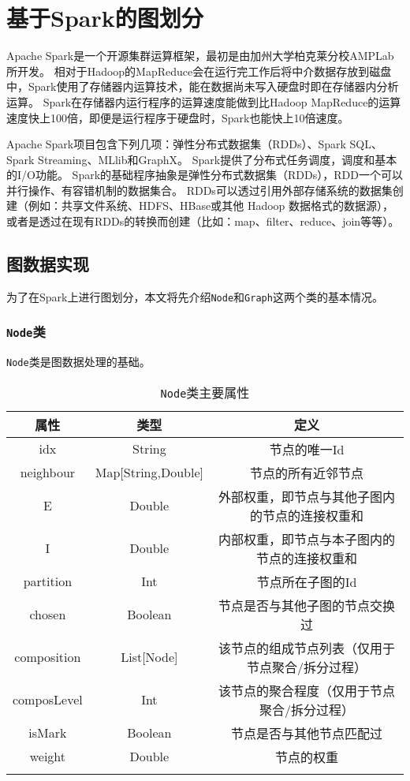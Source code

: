 \section{基于Spark的图划分}

Apache Spark是一个开源集群运算框架，最初是由加州大学柏克莱分校AMPLab所开发。
相对于Hadoop的MapReduce会在运行完工作后将中介数据存放到磁盘中，Spark使用了存储器内运算技术，能在数据尚未写入硬盘时即在存储器内分析运算。
Spark在存储器内运行程序的运算速度能做到比Hadoop MapReduce的运算速度快上100倍，即便是运行程序于硬盘时，Spark也能快上10倍速度。

Apache Spark项目包含下列几项：弹性分布式数据集（RDDs）、Spark SQL、Spark Streaming、MLlib和GraphX。
Spark提供了分布式任务调度，调度和基本的I/O功能。
Spark的基础程序抽象是弹性分布式数据集（RDDs），RDD一个可以并行操作、有容错机制的数据集合。
RDDs可以透过引用外部存储系统的数据集创建（例如：共享文件系统、HDFS、HBase或其他 Hadoop 数据格式的数据源），
或者是透过在现有RDDs的转换而创建（比如：map、filter、reduce、join等等）。 

\subsection{图数据实现}

为了在Spark上进行图划分，本文将先介绍\texttt{Node}和\texttt{Graph}这两个类的基本情况。

\subsubsection{\texttt{Node}类}

\texttt{Node}类是图数据处理的基础。

\begin{table}[htbp]
    \centering
    \caption{\texttt{Node}类主要属性}
    \begin{tabular}{ccc}
        \hline
        属性& 类型 & 定义\\
        \hline
        idx         & String             & 节点的唯一Id \\
        neighbour   & Map[String,Double] & 节点的所有近邻节点\\
        E           & Double             & 外部权重，即节点与其他子图内的节点的连接权重和\\
        I           & Double             & 内部权重，即节点与本子图内的节点的连接权重和\\
        partition   & Int                & 节点所在子图的Id\\
        chosen      & Boolean            & 节点是否与其他子图的节点交换过\\
        composition & List[Node]         & 该节点的组成节点列表（仅用于节点聚合/拆分过程）\\
        composLevel & Int                & 该节点的聚合程度（仅用于节点聚合/拆分过程）\\
        isMark      & Boolean            & 节点是否与其他节点匹配过 \\
        weight      & Double             & 节点的权重\\
        \hline
        \centering
    \end{tabular}
\end{table}

